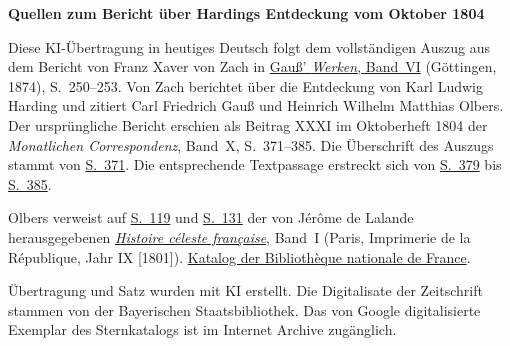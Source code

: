 \clearpage\thispagestyle{empty}
\begin{center}\textbf{Quellen zum Bericht über Hardings Entdeckung vom Oktober 1804}\end{center}
\noindent Diese KI-Übertragung in heutiges Deutsch folgt dem vollständigen Auszug aus dem Bericht von Franz Xaver von Zach in \href{https://gdz.sub.uni-goettingen.de/id/PPN236007467}{Gauß’ \textit{Werken}, Band~VI} (Göttingen, 1874), S.~250--253. Von Zach berichtet über die Entdeckung von Karl Ludwig Harding und zitiert Carl Friedrich Gauß und Heinrich Wilhelm Matthias Olbers. Der ursprüngliche Bericht erschien als Beitrag XXXI im Oktoberheft 1804 der \textit{Monatlichen Correspondenz}, Band~X, S.~371--385. Die Überschrift des Auszugs stammt von \href{https://www.digitale-sammlungen.de/en/view/bsb10538602?page=385}{S.~371}. Die entsprechende Textpassage erstreckt sich von \href{https://www.digitale-sammlungen.de/en/view/bsb10538602?page=393}{S.~379} bis \href{https://www.digitale-sammlungen.de/en/view/bsb10538602?page=399}{S.~385}.
\par\smallskip\noindent Olbers verweist auf \href{https://archive.org/download/histoireclestef00lalagoog/page/n146.jpg}{S.~119} und \href{https://archive.org/download/histoireclestef00lalagoog/page/n158.jpg}{S.~131} der von Jérôme de Lalande herausgegebenen \href{https://archive.org/download/histoireclestef00lalagoog/page/n12.jpg}{\textit{Histoire céleste française}}, Band~I (Paris, Imprimerie de la République, Jahr IX [1801]). \href{https://catalogue.bnf.fr/ark:/12148/cb30722242z}{Katalog der Bibliothèque nationale de France}.
\par\smallskip\noindent Übertragung und Satz wurden mit KI erstellt. Die Digitalisate der Zeitschrift stammen von der Bayerischen Staatsbibliothek. Das von Google digitalisierte Exemplar des Sternkatalogs ist im Internet Archive zugänglich.
\clearpage

